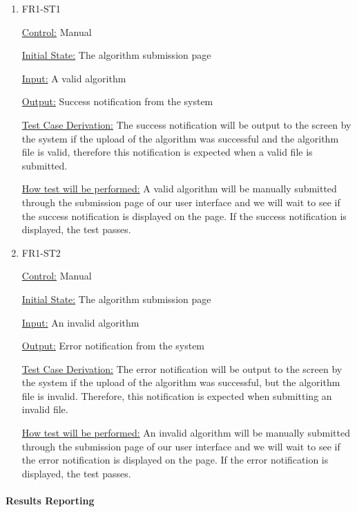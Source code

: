 \documentclass[12pt, titlepage]{article}
\begin{document}
\begin{enumerate}

\item{FR1-ST1\\}

\underline{Control:} Manual

\underline{Initial State:} The algorithm submission page

\underline{Input:} A valid algorithm 

\underline{Output:} Success notification from the system

\underline{Test Case Derivation:} The success notification will be output to the screen by the system if the upload of the algorithm was successful and the algorithm file is valid, therefore this notification is expected when a valid file is submitted. 

\underline{How test will be performed:} A valid algorithm will be manually submitted through the submission page of our user interface and we will wait to see if the success notification is displayed on the page. If the success notification is displayed, the test passes.
					
\item{FR1-ST2\\}

\underline{Control:} Manual

\underline{Initial State:} The algorithm submission page

\underline{Input:} An invalid algorithm

\underline{Output:} Error notification from the system

\underline{Test Case Derivation:} The error notification will be output to the screen by the system if the upload of the algorithm was successful, but the algorithm file is invalid. Therefore, this notification is expected when submitting an invalid file.  

\underline{How test will be performed:} An invalid algorithm will be manually submitted through the submission page of our user interface and we will wait to see if the error notification is displayed on the page. If the error notification is displayed, the test passes.

\end{enumerate}

\paragraph{Results Reporting}
\end{document}
